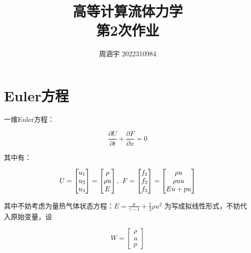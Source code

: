 \documentclass[UTF8,zihao=5]{ctexart} %
\title{{\bfseries\rmfamily\Huge{高等计算流体力学\hspace{1em}\\第2次作业}}}
\author{周涵宇 2022310984}
\date{}
\newcommand*{\pd}[2]{\frac{\partial #1}{\partial #2}}
\begin{document}
\maketitle



\section{Euler方程}

\label{sec:1}

一维Euler方程：

\begin{equation}
    \pd{U}{t}+\pd{F}{x}=0
\end{equation}

其中有：

\begin{equation}
    U=\begin{bmatrix}
        u_1 \\u_2\\u_3
    \end{bmatrix}
    =\begin{bmatrix}
        \rho   \\
        \rho u \\
        E
    \end{bmatrix},\ \ \\
    F=\begin{bmatrix}
        f_1 \\f_2\\f_3
    \end{bmatrix}
    =\begin{bmatrix}
        \rho u  \\
        \rho uu \\
        Eu + pu
    \end{bmatrix}
\end{equation}

其中不妨考虑为量热气体状态方程：$E=\frac{p}{\gamma-1}+\frac{1}{2}\rho u^2$
为写成拟线性形式，不妨代入原始变量，设

$$
    W=\begin{bmatrix}
        \rho \\u\\p
    \end{bmatrix}
$$
\end{document}
